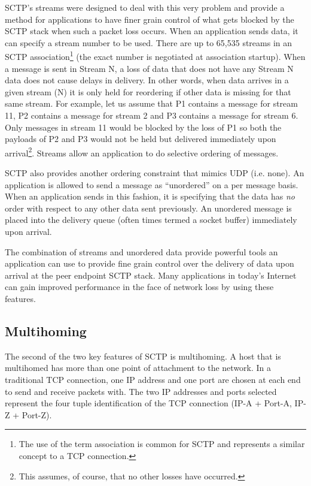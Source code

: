 \documentclass[conference]{IEEEtran}
\begin{document}
SCTP's streams were designed to deal with this very problem and provide a
method for applications to have finer grain control of what gets blocked by
the SCTP stack when such a packet loss occurs. When an application sends
data, it can specify a stream number to be used. There are up to 65,535 streams in an
SCTP association\footnote{The use of the term association is common for SCTP and
represents a similar concept to a TCP connection.}
(the exact number is negotiated at association startup).
When a message is sent in Stream N, a loss of data  that does not have
any Stream N data does not cause delays in delivery. In other words, when data arrives
in a given stream (N) it is only held for reordering if other data is missing for that same stream.
For example, let us assume that P1 contains a message for stream 11, P2 contains a message for stream 2 and 
P3 contains a message for stream 6. Only messages in stream 11 would be blocked by
the loss of P1 so both the payloads of P2 and P3 would not be held but delivered 
immediately upon arrival\footnote{This assumes, of course, that no other losses have occurred.}.
Streams allow an application to do selective ordering of messages. 

SCTP also provides another ordering constraint that mimics UDP (i.e. none). An application
is allowed to send a message as ``unordered'' on a per message basis. When an application sends in this
fashion, it is specifying that the data has \emph{no} order with respect to any other
data sent previously. An unordered message is placed into the delivery queue (often
times termed a socket buffer) immediately upon arrival. 

The combination of streams and unordered data provide powerful tools an application
can use to provide fine grain control over the delivery of data upon arrival at
the peer endpoint SCTP stack. Many applications in today's Internet can gain
improved performance in the face of network loss by using these features.

\subsection{Multihoming}
\label{multi}
The second of the two key features of SCTP is multihoming. A host that
is multihomed has more than one point of attachment to the network.
In a traditional TCP connection, one IP address and one port are chosen at each end to 
send and receive packets with. The two IP addresses and ports selected represent
the four tuple identification of the TCP connection (IP-A + Port-A, IP-Z + Port-Z).
\end{document}
